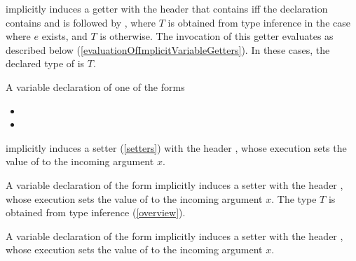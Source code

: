 \documentclass[makeidx]{article}
\begin{document}
\noindent
implicitly induces a getter with the header that
contains \STATIC{} if{}f the declaration contains \STATIC{} and is followed by
,
where $T$ is obtained from type inference
in the case where $e$ exists,
and $T$ is \DYNAMIC{} otherwise.
The invocation of this getter evaluates as described below
(\ref{evaluationOfImplicitVariableGetters}).
In these cases, the declared type of \id{} is $T$.
\EndCase


\LMHash{}%
A variable declaration of one of the forms

\begin{itemize}
\item {}
\item {}
\end{itemize}

\noindent
implicitly induces a setter (\ref{setters}) with the header
,
whose execution sets the value of \id{} to the incoming argument $x$.

\LMHash{}%
A variable declaration of the form
implicitly induces a setter with the header
,
whose execution sets the value of \id{} to the incoming argument $x$.
The type $T$ is obtained from type inference
(\ref{overview}).
\EndCase

\LMHash{}%
A variable declaration of the form
implicitly induces a setter with the header
,
whose execution sets the value of \id{} to the incoming argument $x$.

\EndCase
\end{document}

